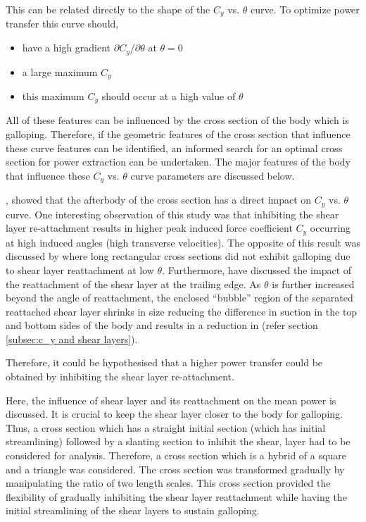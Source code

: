 This can be related directly to the shape of the $C_y$ vs. $\theta$ curve. To optimize power
transfer this curve should,

\begin{itemize}
\item have a high gradient $\partial C_y/\partial \theta$ at
  $\theta = 0$
\item a large maximum $C_y$
\item this maximum $C_y$ should occur at a high value of $\theta$
\end{itemize}

All of these features can be influenced by the cross section of the
body which is galloping. Therefore, if the geometric features of the
cross section that influence these curve features can be identified,
an informed search for an optimal cross section for power extraction
can be undertaken. The major features of the body that influence these
$C_y$ vs. $\theta$ curve parameters are discussed below.

\citet{Luo1994}, showed that the afterbody of the cross section has a direct impact on $C_y$ vs. $\theta$ curve. One interesting observation of this study was that inhibiting the shear layer re-attachment results in higher peak induced force coefficient $C_y$ occurring at high induced angles (high transverse velocities). The opposite of this result was discussed by \citet{Robertson2003} where long rectangular cross sections did not exhibit galloping due to shear layer reattachment at low $\theta$. Furthermore, \citet{Luo1994} have discussed the impact of the reattachment of the shear layer at the trailing edge. As $\theta$ is further increased beyond the angle of reattachment, the enclosed ``bubble'' region of the separated reattached shear layer shrinks in size reducing the difference in suction in the top and bottom sides of the body and results in a reduction in \cy (refer section \ref{subsec:c_y and shear layers}). 

Therefore, it could be hypothesised that a higher power transfer could be obtained by inhibiting the shear layer re-attachment. 

Here, the influence of shear layer and its reattachment on the mean power is discussed. It is crucial to keep the shear layer closer to the body for galloping. Thus, a cross section which has a straight initial section (which has initial streamlining) followed by a slanting section to inhibit the shear, layer had to be considered for analysis. Therefore, a cross section which is a hybrid of a square and a triangle was considered. The cross section was transformed gradually by manipulating the ratio of two length scales. This cross section provided the flexibility of gradually inhibiting the shear layer reattachment while having the initial streamlining of the shear layers to sustain galloping. 

